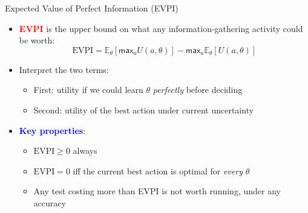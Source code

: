 \documentclass[
  10pt,
  ignorenonframetext,
]{beamer}
\providecommand{\tightlist}{%
  \setlength{\itemsep}{0pt}\setlength{\parskip}{0pt}}
\newcommand{\EE}{\mathbb{E}}
\def\max{\textsf{max}}
\begin{document}
\begin{frame}{Expected Value of Perfect Information (EVPI)}
\label{expected-value-of-perfect-information-evpi}
\begin{itemize}
\item
  \textbf{\textcolor{red}{EVPI}} is the upper bound on what any
  information-gathering activity could be worth: \[
  \text{EVPI} = \EE_{\theta} \left[ \max_a U(a, \theta) \right] -
                \max_a \EE_\theta[U(a, \theta)]
  \]
\item
  Interpret the two terms:

  \begin{itemize}
  \tightlist
  \item
    First: utility if we could learn \(\theta\) \emph{perfectly} before
    deciding
  \item
    Second: utility of the best action under current uncertainty
  \end{itemize}
\item
  \textbf{\textcolor{blue}{Key properties}}:

  \begin{itemize}
  \tightlist
  \item
    \(\text{EVPI} \geq 0\) always
  \item
    \(\text{EVPI} = 0\) iff the current best action is optimal for
    \emph{every} \(\theta\)
  \item
    Any test costing more than EVPI is not worth running, under any
    accuracy
  \end{itemize}
\end{itemize}
\end{frame}
\end{document}
